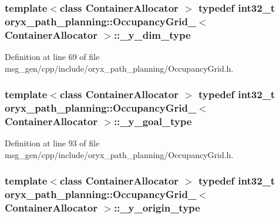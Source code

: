 \subsubsection[{\-\_\-y\-\_\-dim\-\_\-type}]{\setlength{\rightskip}{0pt plus 5cm}template$<$class Container\-Allocator $>$ typedef int32\-\_\-t {\bf oryx\-\_\-path\-\_\-planning\-::\-Occupancy\-Grid\-\_\-}$<$ \-Container\-Allocator $>$\-::{\bf \-\_\-y\-\_\-dim\-\_\-type}}\label{structoryx__path__planning_1_1OccupancyGrid___a92f3a4fa41ae3065ca827868ff1cee19}


\-Definition at line 69 of file msg\-\_\-gen/cpp/include/oryx\-\_\-path\-\_\-planning/\-Occupancy\-Grid.\-h.

\subsubsection[{\-\_\-y\-\_\-goal\-\_\-type}]{\setlength{\rightskip}{0pt plus 5cm}template$<$class Container\-Allocator $>$ typedef int32\-\_\-t {\bf oryx\-\_\-path\-\_\-planning\-::\-Occupancy\-Grid\-\_\-}$<$ \-Container\-Allocator $>$\-::{\bf \-\_\-y\-\_\-goal\-\_\-type}}\label{structoryx__path__planning_1_1OccupancyGrid___a078cf4d90b717873525759cc26778a16}


\-Definition at line 93 of file msg\-\_\-gen/cpp/include/oryx\-\_\-path\-\_\-planning/\-Occupancy\-Grid.\-h.

\subsubsection[{\-\_\-y\-\_\-origin\-\_\-type}]{\setlength{\rightskip}{0pt plus 5cm}template$<$class Container\-Allocator $>$ typedef int32\-\_\-t {\bf oryx\-\_\-path\-\_\-planning\-::\-Occupancy\-Grid\-\_\-}$<$ \-Container\-Allocator $>$\-::{\bf \-\_\-y\-\_\-origin\-\_\-type}}\label{structoryx__path__planning_1_1OccupancyGrid___a2482cd686b821d2fe674e15db7d4cbb2}


